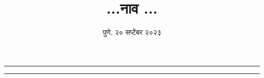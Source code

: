 \documentclass[a6paper]{article}   %
\begin{document}
\title{...नाव ...}
\author{}
\date{पुणे, २० सप्टेंबर २०२३}
\maketitle
\vspace{5mm}
\hrule

\vspace{5mm}
\hrule
\end{document}
